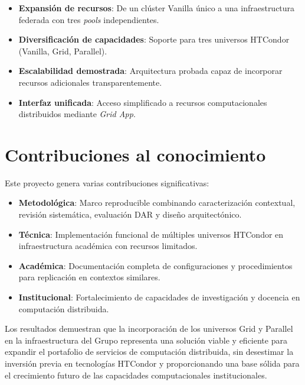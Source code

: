 \begin{itemize}
    \item \textbf{Expansión de recursos}: De un clúster Vanilla único a una infraestructura federada con tres \textit{pools} independientes.
    \item \textbf{Diversificación de capacidades}: Soporte para tres universos HTCondor (Vanilla, Grid, Parallel).
    \item \textbf{Escalabilidad demostrada}: Arquitectura probada capaz de incorporar recursos adicionales transparentemente.
    \item \textbf{Interfaz unificada}: Acceso simplificado a recursos computacionales distribuidos mediante \textit{Grid App}.
\end{itemize}

\section{Contribuciones al conocimiento}
\noindent

Este proyecto genera varias contribuciones significativas:

\begin{itemize}
    \item \textbf{Metodológica}: Marco reproducible combinando caracterización contextual, revisión sistemática, evaluación DAR y diseño arquitectónico.
    \item \textbf{Técnica}: Implementación funcional de múltiples universos HTCondor en infraestructura académica con recursos limitados.
    \item \textbf{Académica}: Documentación completa de configuraciones y procedimientos para replicación en contextos similares.
    \item \textbf{Institucional}: Fortalecimiento de capacidades de investigación y docencia en computación distribuida.
\end{itemize}

Los resultados demuestran que la incorporación de los universos Grid y Parallel en la infraestructura del Grupo \GRID representa una solución viable y eficiente para expandir el portafolio de servicios de computación distribuida, sin desestimar la inversión previa en tecnologías HTCondor y proporcionando una base sólida para el crecimiento futuro de las capacidades computacionales institucionales.
